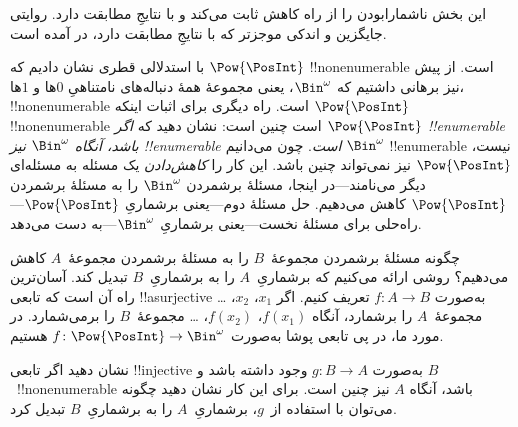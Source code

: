 \documentclass[../../../include/open-logic-section]{subfiles}
\begin{document}


\begin{editorial}
  این بخش ناشمارابودن را از راه کاهش ثابت می‌کند و با نتایجِ
   مطابقت دارد. روایتی جایگزین و اندکی موجزتر که با
  نتایجِ  مطابقت دارد، در 
  آمده است.
\end{editorial}

با استدلالی قطری نشان دادیم که $\Pow{\PosInt}$ !!{nonenumerable} است.
از پیش نیز برهانی داشتیم که $\Bin^\omega$، یعنی مجموعهٔ همهٔ
دنباله‌های نامتناهیِ $0$ها و $1$ها، !!{nonenumerable} است. راه دیگری
برای اثبات اینکه $\Pow{\PosInt}$ !!{nonenumerable} است چنین است: نشان دهید
که \emph{اگر $\Pow{\PosInt}$ !!{enumerable} باشد، آنگاه $\Bin^\omega$
  نیز !!{enumerable} است}. چون می‌دانیم $\Bin^\omega$ !!{enumerable}
نیست، $\Pow{\PosInt}$ نیز نمی‌تواند چنین باشد. این کار را
\emph{کاهش‌دادن} یک مسئله به مسئله‌ای دیگر می‌نامند---در اینجا، مسئلهٔ
برشمردن $\Bin^\omega$ را به مسئلهٔ برشمردن $\Pow{\PosInt}$ کاهش
می‌دهیم. حل مسئلهٔ دوم---یعنی برشماریِ $\Pow{\PosInt}$---راه‌حلی برای
مسئلهٔ نخست---یعنی برشماریِ $\Bin^\omega$---به دست می‌دهد.

چگونه مسئلهٔ برشمردن مجموعهٔ~$B$ را به مسئلهٔ برشمردن مجموعهٔ~$A$
کاهش می‌دهیم؟ روشی ارائه می‌کنیم که برشماریِ~$A$ را به برشماریِ~$B$
تبدیل کند. آسان‌ترین راه آن است که تابعی !!a{surjective} به‌صورت
$f\colon A \to B$ تعریف کنیم. اگر $x_1$، $x_2$، \dots{} مجموعهٔ~$A$ را
برشمارد، آنگاه $f(x_1)$، $f(x_2)$، \dots{} مجموعهٔ~$B$ را برمی‌شمارد.
در مورد ما، در پی تابعی پوشا به‌صورت
$f\colon \Pow{\PosInt} \to \Bin^\omega$ هستیم.

\begin{prob}
نشان دهید اگر تابعی !!{injective} به‌صورت $g\colon B \to A$ وجود داشته
باشد و $B$~!!{nonenumerable} باشد، آنگاه $A$ نیز چنین است. برای این
کار نشان دهید چگونه می‌توان با استفاده از~$g$، برشماریِ~$A$ را به
برشماریِ~$B$ تبدیل کرد.
\end{prob}
\end{document}
